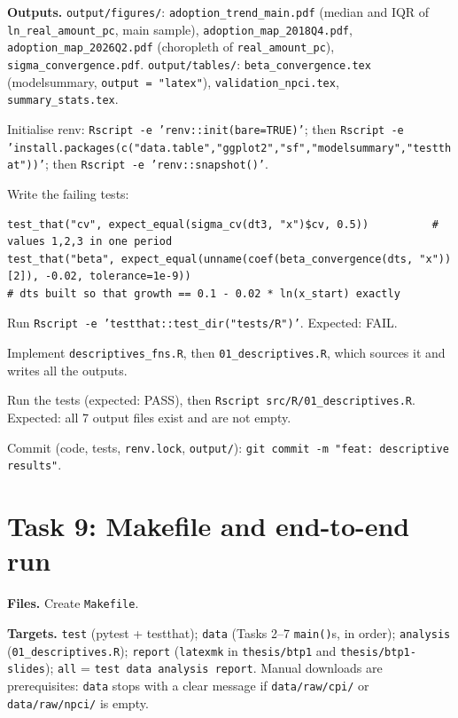 \documentclass[10pt,a4paper]{article}
\newcommand{\f}[1]{\texttt{#1}}
\begin{document}
\textbf{Outputs.} \f{output/figures/}: \f{adoption\_trend\_main.pdf} (median and IQR of \f{ln\_real\_amount\_pc}, main
sample), \f{adoption\_map\_2018Q4.pdf}, \f{adoption\_map\_2026Q2.pdf} (choropleth of \f{real\_amount\_pc}),
\f{sigma\_convergence.pdf}. \f{output/tables/}: \f{beta\_convergence.tex} (modelsummary, \f{output = "latex"}),
\f{validation\_npci.tex}, \f{summary\_stats.tex}.

\begin{steps}
\item Initialise renv: \f{Rscript -e 'renv::init(bare=TRUE)'}; then
      \f{Rscript -e 'install.packages(c("data.table","ggplot2","sf","modelsummary","testthat"))'};
      then \f{Rscript -e 'renv::snapshot()'}.
\item Write the failing tests:
\begin{verbatim}
test_that("cv", expect_equal(sigma_cv(dt3, "x")$cv, 0.5))          # values 1,2,3 in one period
test_that("beta", expect_equal(unname(coef(beta_convergence(dts, "x"))[2]), -0.02, tolerance=1e-9))
# dts built so that growth == 0.1 - 0.02 * ln(x_start) exactly
\end{verbatim}
\item Run \f{Rscript -e 'testthat::test\_dir("tests/R")'}. Expected: FAIL.
\item Implement \f{descriptives\_fns.R}, then \f{01\_descriptives.R}, which sources it and writes all the outputs.
\item Run the tests (expected: PASS), then \f{Rscript src/R/01\_descriptives.R}. Expected: all 7 output files exist
      and are not empty.
\item Commit (code, tests, \f{renv.lock}, \f{output/}): \f{git commit -m "feat: descriptive results"}.
\end{steps}

\section{Task 9: Makefile and end-to-end run}
\textbf{Files.} Create \f{Makefile}.

\textbf{Targets.} \f{test} (pytest + testthat); \f{data} (Tasks 2--7 \f{main()}s, in order); \f{analysis}
(\f{01\_descriptives.R}); \f{report} (\f{latexmk} in \f{thesis/btp1} and \f{thesis/btp1-slides});
\f{all} = \f{test data analysis report}. Manual downloads are prerequisites: \f{data} stops with a clear
message if \f{data/raw/cpi/} or \f{data/raw/npci/} is empty.
\end{document}
